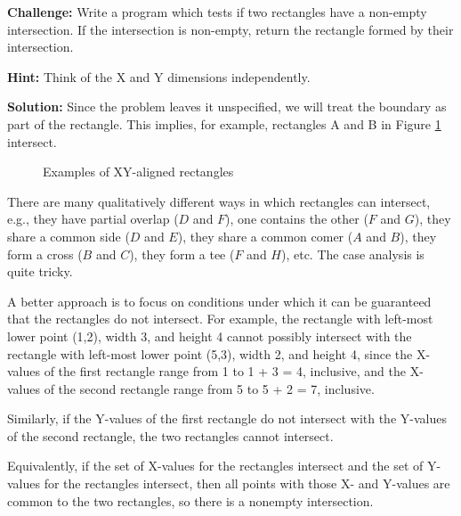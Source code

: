 \documentclass[11pt,a4paper]{article}
\begin{document}
\textbf{Challenge:} Write a program which tests if two rectangles have a
non-empty intersection. If the intersection is non-empty, return the rectangle
formed by their intersection.

\textbf{Hint:} Think of the X and Y dimensions independently.

\textbf{Solution:} Since the problem leaves it unspecified, we will treat the
boundary as part of the rectangle. This implies, for example, rectangles A and
B in Figure \ref{fig:rectangles} intersect.

\begin{figure}[hb]
\centering
{}
\caption{Examples of XY-aligned rectangles}
\label{fig:rectangles}
\end{figure}

There are many qualitatively different ways in which rectangles can intersect,
e.g., they have partial overlap ($D$ and $F$), one contains the other ($F$ and
$G$), they share a common side ($D$ and $E$), they share a common comer ($A$
and $B$), they form a cross ($B$ and $C$), they form a tee ($F$ and $H$), etc.
The case analysis is quite tricky.

A better approach is to focus on conditions under which it can be guaranteed
that the rectangles do not intersect. For example, the rectangle with
left-most lower point (1,2), width 3, and height 4 cannot possibly intersect
with the rectangle with left-most lower point (5,3), width 2, and height 4,
since the X-values of the first rectangle range from 1 to 1 + 3 = 4,
inclusive, and the X-values of the second rectangle range from 5 to 5 + 2 = 7,
inclusive.

Similarly, if the Y-values of the first rectangle do not intersect with the
Y-values of the second rectangle, the two rectangles cannot intersect.

Equivalently, if the set of X-values for the rectangles intersect and the set
of Y-values for the rectangles intersect, then all points with those X- and
Y-values are common to the two rectangles, so there is a nonempty
intersection.
\end{document}
